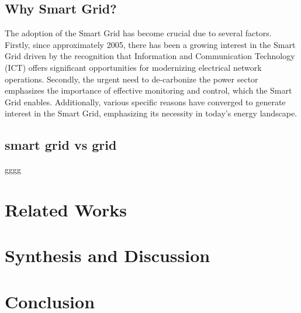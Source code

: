 \subsection{Why Smart Grid?}
The adoption of the Smart Grid has become crucial due to several factors. Firstly, since approximately 2005, there has been a growing interest in the Smart Grid driven by the recognition that Information and Communication Technology (ICT) offers significant opportunities for modernizing electrical network operations. Secondly, the urgent need to de-carbonize the power sector emphasizes the importance of effective monitoring and control, which the Smart Grid enables. Additionally, various specific reasons have converged to generate interest in the Smart Grid, emphasizing its necessity in today’s energy landscape.\cite{ekanayake2012smart}
\subsection{smart grid vs grid}
gggg \cite{farhangi2009path}
\section{Related Works}
\section{Synthesis and Discussion}
\section*{Conclusion}

